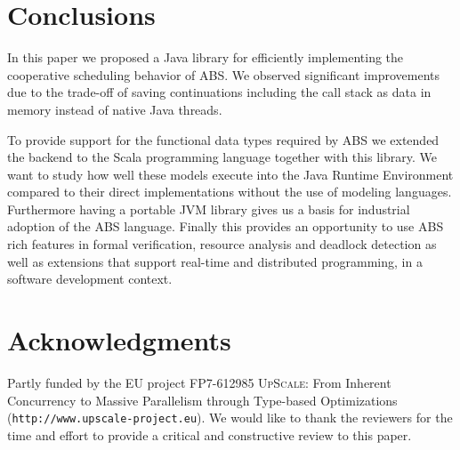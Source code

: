 \section{Conclusions}
\label{conc}
In this paper we proposed a Java library for efficiently implementing the cooperative scheduling behavior of ABS. We observed significant improvements due to the trade-off of saving continuations including the call stack as data in memory instead of native Java threads. 

To provide support for the functional data types required by ABS we extended the backend to the Scala programming language together with this library. We want to study how well these models execute into the Java Runtime Environment compared to their direct implementations without the use of modeling languages. Furthermore having a portable JVM library gives us a basis for industrial adoption of the ABS language.  Finally this provides an opportunity to use ABS rich features in formal verification,  resource analysis and deadlock detection as well as extensions that support real-time and distributed programming, in a software development context. 


\section{Acknowledgments}
Partly funded by the EU project FP7-612985
\textsc{UpScale}: From Inherent Concurrency to Massive Parallelism
through Type-based Optimizations \\ (\texttt{http:/$\!$/www.upscale-project.eu}). We would like to thank the reviewers for the time and effort to provide a critical and constructive review to this paper.

